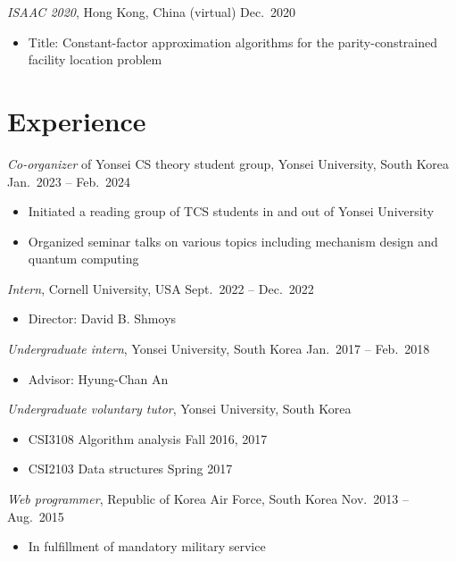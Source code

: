 \documentclass{article}
\newcommand{\killinitspace}{-0.7em}
\begin{document}
\textsl{ISAAC 2020}, Hong Kong, China (virtual) \hfill Dec.~2020
\vspace{\killinitspace}
\begin{itemize}
\item Title: Constant-factor approximation algorithms for the parity-constrained facility location problem
\end{itemize}


\section{Experience}
\textsl{Co-organizer} of Yonsei CS theory student group, Yonsei University, South Korea \hfill Jan.~2023 -- Feb.~2024
\vspace{\killinitspace}
\begin{itemize}
\item Initiated a reading group of TCS students in and out of Yonsei University
\item Organized seminar talks on various topics including mechanism design and quantum computing
\end{itemize}

\textsl{Intern}, Cornell University, USA \hfill Sept.~2022 -- Dec.~2022
\vspace{\killinitspace}
\begin{itemize}
\item Director: David B. Shmoys
\end{itemize}

\textsl{Undergraduate intern}, Yonsei University, South Korea \hfill Jan.~2017 -- Feb.~2018
\vspace{\killinitspace}
\begin{itemize}
\item Advisor: Hyung-Chan An
\end{itemize}

\textsl{Undergraduate voluntary tutor}, Yonsei University, South Korea
\vspace{\killinitspace}
\begin{itemize}
\item CSI3108 Algorithm analysis \hfill Fall 2016, 2017
\item CSI2103 Data structures \hfill Spring 2017
\end{itemize}

\textsl{Web programmer}, Republic of Korea Air Force, South Korea \hfill Nov.~2013 -- Aug.~2015
\vspace{\killinitspace}
\begin{itemize}
\item In fulfillment of mandatory military service
\end{itemize}
\end{document}
